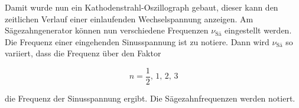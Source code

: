 Damit wurde nun ein Kathodenstrahl-Oszillograph gebaut, dieser kann den zeitlichen Verlauf einer einlaufenden Wechselspannung anzeigen.
Am Sägezahngenerator können nun verschiedene Frequenzen $\nu _\text{Sä}$ eingestellt werden.
Die Frequenz einer eingehenden Sinusspannung ist zu notiere.
Dann wird $\nu _\text{Sä}$ so variiert, dass die Frequenz über den Faktor  

\begin{equation}
    n = \frac{1}{2}, \, 1, \, 2, \, 3
\end{equation}

die Frequenz der Sinusspannung ergibt. 
Die Sägezahnfrequenzen werden notiert.